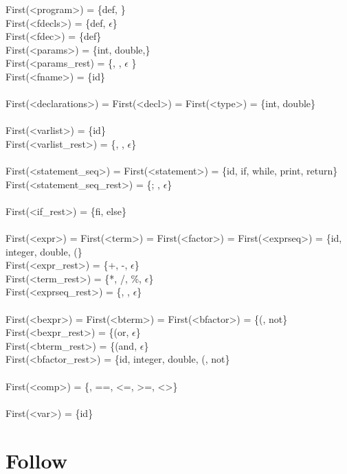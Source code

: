 \documentclass{article}
\begin{document}
\noindent
First(<program>) = \{def, \} \\
First(<fdecls>) = \{def, $\epsilon$\}\\
First(<fdec>) = \{def\}\\
First(<params>) = \{int, double,\}\\
First(<params\_rest) = \{, , $\epsilon$ \}\\
First(<fname>) = \{id\}\\
\\
First(<declarations>) = First(<decl>)  = First(<type>) = \{int, double\}\\
\\
First(<varlist>) = \{id\}\\
First(<varlist\_rest>) = \{, , $\epsilon$\}\\
\\
First(<statement\_seq>) = First(<statement>) = \{id, if, while, print, return\}\\
First(<statement\_seq\_rest>) = \{; , $\epsilon$\}\\
\\
First(<if\_rest>) = \{fi, else\}\\
\\
First(<expr>) = First(<term>) = First(<factor>) = First(<exprseq>) = \{id, integer, double, (\}\\
First(<expr\_rest>) = \{+, -, $\epsilon$\}\\
First(<term\_rest>) = \{*, /, \%, $\epsilon$\}\\
First(<exprseq\_rest>) = \{, , $\epsilon$\}\\
\\
First(<bexpr>) = First(<bterm>) = First(<bfactor>) = \{(, not\}\\
First(<bexpr\_rest>) = \{(or, $\epsilon$\}\\
First(<bterm\_rest>) = \{(and, $\epsilon$\}\\
First(<bfactor\_rest>) = \{id, integer, double, (, not\}\\
\\
First(<comp>) = \{<, >, ==, <=, >=, <>\}\\
\\
First(<var>) = \{id\}\\

\section*{Follow}
\end{document}
